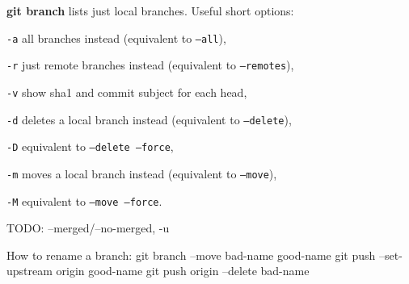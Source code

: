 %

\textbf{git branch} lists just local branches.
Useful short options:
\begin{compactenum}
\item [\texttt{-a}] all branches instead (equivalent to \texttt{--all}),
\item [\texttt{-r}] just remote branches instead (equivalent to \texttt{--remotes}),
\item [\texttt{-v}] show sha1 and commit subject for each head,
\item [\texttt{-d}] deletes a local branch instead (equivalent to \texttt{--delete}),
\item [\texttt{-D}] equivalent to \texttt{--delete --force},
\item [\texttt{-m}] moves a local branch instead (equivalent to \texttt{--move}),
\item [\texttt{-M}] equivalent to \texttt{--move --force}.
\end{compactenum}

TODO: --merged/--no-merged, -u

How to rename a branch:
git branch --move bad-name good-name
git push --set-upstream origin good-name
git push origin --delete bad-name

%